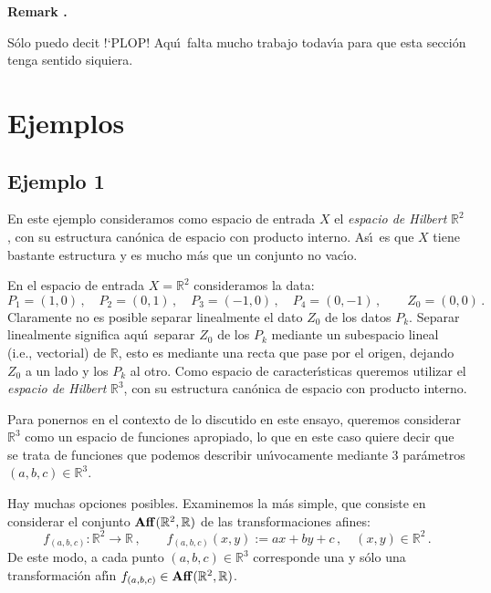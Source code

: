 \documentclass[12pt,reqno]{amsart}
\newenvironment{mycolor}{\color{red}}{}
\newcounter{myremarkcount}
\newenvironment{myremark}
{%
\medskip
\begin{flushright}
\begin{lrbox}{\myremarkbox}%
\begin{minipage}[t]{0.9\linewidth}
\stepcounter{myremarkcount}
\footnotesize
\begin{mycolor}
{\bf Remark \arabic{myremarkcount}.}
\begin{it}
}
{%
\end{it}
\end{mycolor}
\end{minipage}
\end{lrbox}
\fbox{\usebox{\myremarkbox}}
\end{flushright}

\bigskip}
\begin{document}
\begin{myremark}
S\'olo puedo decit !`PLOP!
Aqu\'\i\ falta mucho trabajo todav\'\i a para que esta secci\'on
tenga sentido siquiera.
\end{myremark}


\newpage
\section{Ejemplos}


\subsection{Ejemplo 1}
En este ejemplo consideramos como espacio de entrada $X$ el
{\em espacio de Hilbert\/} $\mathbb{R}^2$, con su estructura
can\'onica de espacio con producto interno.
As\'\i\ es que $X$ tiene bastante estructura y es mucho m\'as que
un conjunto no vac\'\i o.

\smallskip\noindent
En el espacio de entrada $X=\mathbb{R}^2$ consideramos la data:
$$
P_1=(1,0)\,,\quad
P_2=(0,1)\,,\quad
P_3=(-1,0)\,,\quad
P_4=(0,-1)\,,\qquad
Z_0=(0,0)\,.
$$
Claramente no es posible separar linealmente el dato $Z_0$
de los datos $P_k$.
Separar linealmente significa aqu\'\i\ separar $Z_0$ de los $P_k$
mediante un subespacio lineal (i.e., vectorial) de $\mathbb{R}$,
esto es mediante una recta que pase por el origen, dejando $Z_0$
a un lado y los $P_k$ al otro.
\smallskip\noindent
Como espacio de caracter\'\i sticas queremos utilizar el
{\em espacio de Hilbert\/} $\mathbb{R}^3$, con su estructura
can\'onica de espacio con producto interno.

\smallskip\noindent
Para ponernos en el contexto de lo discutido en este ensayo,
queremos considerar $\mathbb{R}^3$ como un espacio de funciones
apropiado, lo que en este caso quiere decir que se trata de
funciones que podemos describir un\'\i vocamente mediante 3
par\'ametros $(a,b,c)\in\mathbb{R}^3$.

\smallskip\noindent
Hay muchas opciones posibles.
Examinemos la m\'as simple, que consiste en considerar el conjunto
${\rm\bf Aff}(\mathbb{R}^2,\mathbb{R})$ de las transformaciones afines:
$$
f_{(a,b,c)}:\mathbb{R}^2\to\mathbb{R}\,,\qquad
f_{(a,b,c)}(x,y):= ax+by+c\,,\quad (x,y)\in\mathbb{R}^2\,.
$$
De este modo, a cada punto $(a,b,c)\in\mathbb{R}^3$ corresponde una
y s\'olo una transformaci\'on af\'\i n
$f_{(a,b,c)}\in{\rm\bf Aff}(\mathbb{R}^2,\mathbb{R})$.
\end{document}
